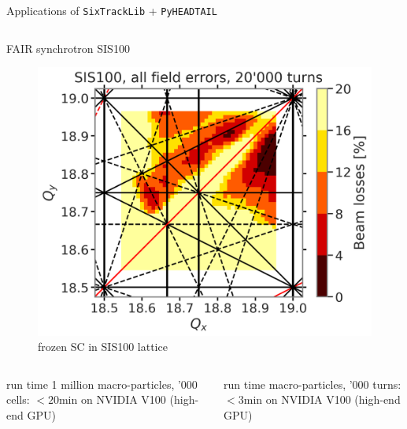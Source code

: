 \documentclass{beamer}
\begin{document}
{\begin{frame}{Applications of  \texttt{SixTrackLib} +  \texttt{PyHEADTAIL}}
\begin{columns}
\begin{column}[T]{0.48\linewidth}
\begin{block}{\centering FAIR synchrotron SIS100}
\begin{figure}
                    \includegraphics[width=\linewidth]{adrian_figs/tunescan_detailed.png}
                    \caption{frozen SC in SIS100 lattice}
                    \label{fig:my_label}
                \end{figure}
            \end{block}
        \end{column}
    \end{columns}
    
    \pause
    \vspace{-5cm}
    
    \begin{columns}\hspace*{0.02\linewidth}
        \begin{column}[T]{0.44\linewidth}
            \begin{alertblock}{\centering run time}
                \centering
                1 million macro-particles, '000 cells: $<20$min on \break NVIDIA V100 (high-end GPU)
            \end{alertblock}
        \end{column}
        \hspace*{0.02\linewidth}
        \hfill
        \hspace*{0.02\linewidth}
        \begin{column}[T]{0.44\linewidth}
            \begin{alertblock}{\centering run time}
                 macro-particles, '000 turns: $<3$min on \break NVIDIA V100 (high-end GPU)
            \end{alertblock}
        \end{column}
        \hspace*{0.02\linewidth}
    \end{columns}
            
    \vspace{5cm}
\end{frame}
}
\end{document}
